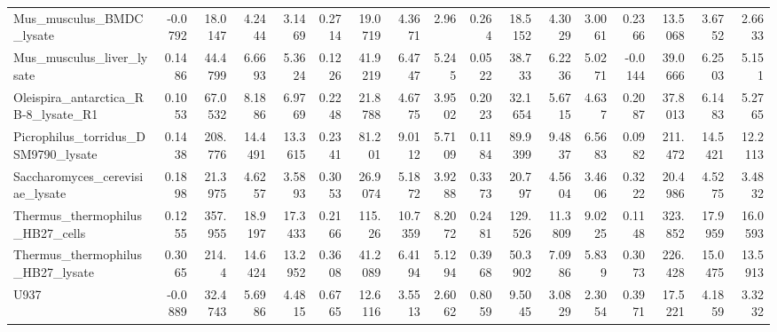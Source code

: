 \begin{tabular}{lrrrrrrrrrrrrrrrr}
 Mus\_musculus\_BMDC\_lysate                    &               -0.0792 &          18.0147 &           4.2444  &           3.1469 &         0.2714   &     19.0719 &      4.3671  &     2.96    &        0.264   &   18.5152 &    4.3029  &   3.0061  &         0.2366   &     13.5068 &      3.6752  &     2.6633  \\
 Mus\_musculus\_liver\_lysate                   &                0.1486 &          44.4799 &           6.6693  &           5.3624 &         0.1226   &     41.9219 &      6.4747  &     5.245   &        0.0522  &   38.733  &    6.2236  &   5.0271  &        -0.0144   &     39.0666 &      6.2503  &     5.151   \\
 Oleispira\_antarctica\_RB-8\_lysate\_R1         &                0.1053 &          67.0532 &           8.1886  &           6.9769 &         0.2248   &     21.8788 &      4.6775  &     3.9502  &        0.2023  &   32.1654 &    5.6715  &   4.637   &         0.2087   &     37.8013 &      6.1483  &     5.2765  \\
 Picrophilus\_torridus\_DSM9790\_lysate         &                0.1438 &         208.776  &          14.4491  &          13.3615 &         0.2341   &     81.201  &      9.0112  &     5.7109  &        0.1184  &   89.9399 &    9.4837  &   6.5683  &         0.0982   &    211.472  &     14.5421  &    12.2113  \\
 Saccharomyces\_cerevisiae\_lysate             &                0.1898 &          21.3975 &           4.6257  &           3.5893 &         0.3053   &     26.9074 &      5.1872  &     3.9288  &        0.3373  &   20.797  &    4.5604  &   3.4606  &         0.3222   &     20.4986 &      4.5275  &     3.4832  \\
 Thermus\_thermophilus\_HB27\_cells             &                0.1255 &         357.955  &          18.9197  &          17.3433 &         0.2166   &    115.26   &     10.7359  &     8.2072  &        0.2481  &  129.526  &   11.3809  &   9.0225  &         0.1148   &    323.852  &     17.9959  &    16.0593  \\
 Thermus\_thermophilus\_HB27\_lysate            &                0.3065 &         214.4    &          14.6424  &          13.2952 &         0.3608   &     41.2089 &      6.4194  &     5.1294  &        0.3968  &   50.3902 &    7.0986  &   5.839   &         0.3073   &    226.428  &     15.0475  &    13.5913  \\
 U937                                        &               -0.0889 &          32.4743 &           5.6986  &           4.4815 &         0.6765   &     12.6116 &      3.5513  &     2.6062  &        0.8059  &    9.5045 &    3.0829  &   2.3054  &         0.3971   &     17.5221 &      4.1859  &     3.3232  \\

\end{tabular}
